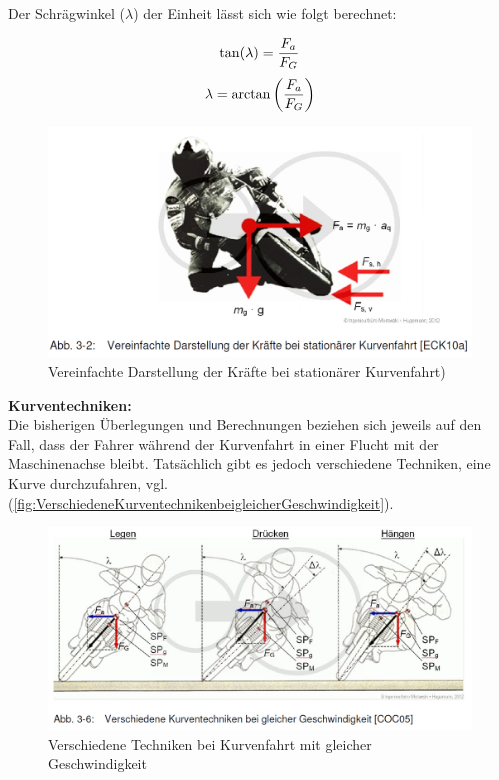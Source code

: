 Der Schrägwinkel ($\lambda$) der Einheit lässt sich wie folgt berechnet:


\begin{align*}
	\centering
	\tan(\lambda)  =  \frac{F_a}{F_G}
\end{align*}
\begin{align}
	\centering
	\lambda  =  \arctan \left(\frac{F_a}{F_G}\right)
	\label{gl:Schraegwinkel}
\end{align}


\begin{figure}[H]
	\centering
	\includegraphics[width=\linewidth]{Bilder/VereinfachteDarstellungDerKraefteBeiStationaererKurvenfahrt.png}
	\caption{Vereinfachte Darstellung der Kräfte bei stationärer Kurvenfahrt)}
	\label{fig:VereinfachteDarstellungDerKraefteBeiStationaererKurvenfahrt}
\end{figure}


\textbf{Kurventechniken:}\\
Die bisherigen Überlegungen und Berechnungen beziehen sich jeweils auf den Fall, dass der Fahrer während der Kurvenfahrt in einer Flucht mit der Maschinenachse bleibt. Tatsächlich gibt es jedoch verschiedene Techniken, eine Kurve durchzufahren, vgl. (\autoref{fig:VerschiedeneKurventechnikenbeigleicherGeschwindigkeit}).
\begin{figure}[H]
	\centering
	\includegraphics[width=\linewidth]{Bilder/VerschiedeneKurventechnikenbeigleicherGeschwindigkeit.png}
	\caption{Verschiedene Techniken bei Kurvenfahrt mit gleicher Geschwindigkeit}
	\label{fig:VerschiedeneKurventechnikenbeigleicherGeschwindigkeit}
\end{figure}

